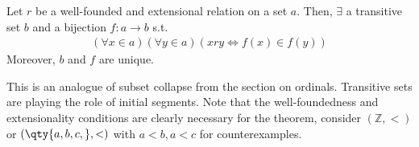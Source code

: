 
\begin{theorem}
    Let $r$ be a well-founded and extensional relation on a set $a$.
    Then, $\exists$ a transitive set $b$ and a bijection $f \colon a \to b$ s.t.
    \begin{align*}
        (\forall x \in a)(\forall y \in a)(x r y \Leftrightarrow f(x) \in f(y))
    \end{align*}
    Moreover, $b$ and $f$ are unique.
\end{theorem}

This is an analogue of subset collapse from the section on ordinals.
Transitive sets are playing the role of initial segments.
Note that the well-foundedness and extensionality conditions are clearly necessary for the theorem, consider $(\mathbb Z, <)$ or $(\qty{a,b,c,},<)$ with $a<b, a<c$ for counterexamples.

